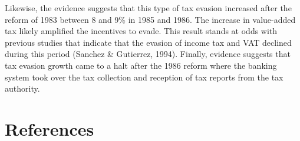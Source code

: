 \documentclass[
  12pt]{article}
\theoremstyle{definition}
\theoremstyle{remark}
\begin{document}
Likewise, the evidence suggests that this type of tax evasion increased
after the reform of 1983 between 8 and 9\% in 1985 and 1986. The
increase in value-added tax likely amplified the incentives to evade.
This result stands at odds with previous studies that indicate that the
evasion of income tax and VAT declined during this period (Sanchez \&
Gutierrez, 1994). Finally, evidence suggests that tax evasion growth
came to a halt after the 1986 reform where the banking system took over
the tax collection and reception of tax reports from the tax authority.

\hypertarget{references}{%
\section*{References}\label{references}}

\renewcommand{\bibsection}{}

\end{document}
